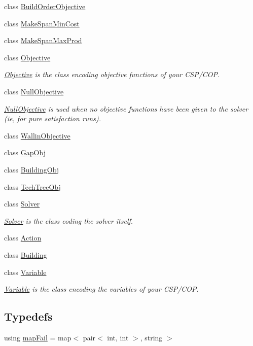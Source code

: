 \begin{DoxyCompactItemize}
class \hyperlink{classghost_1_1BuildOrderObjective}{Build\-Order\-Objective}
\item 
class \hyperlink{classghost_1_1MakeSpanMinCost}{Make\-Span\-Min\-Cost}
\item 
class \hyperlink{classghost_1_1MakeSpanMaxProd}{Make\-Span\-Max\-Prod}
\item 
class \hyperlink{classghost_1_1Objective}{Objective}
\begin{DoxyCompactList}\small\item\em \hyperlink{classghost_1_1Objective}{Objective} is the class encoding objective functions of your C\-S\-P/\-C\-O\-P. \end{DoxyCompactList}\item 
class \hyperlink{classghost_1_1NullObjective}{Null\-Objective}
\begin{DoxyCompactList}\small\item\em \hyperlink{classghost_1_1NullObjective}{Null\-Objective} is used when no objective functions have been given to the solver (ie, for pure satisfaction runs). \end{DoxyCompactList}\item 
class \hyperlink{classghost_1_1WallinObjective}{Wallin\-Objective}
\item 
class \hyperlink{classghost_1_1GapObj}{Gap\-Obj}
\item 
class \hyperlink{classghost_1_1BuildingObj}{Building\-Obj}
\item 
class \hyperlink{classghost_1_1TechTreeObj}{Tech\-Tree\-Obj}
\item 
class \hyperlink{classghost_1_1Solver}{Solver}
\begin{DoxyCompactList}\small\item\em \hyperlink{classghost_1_1Solver}{Solver} is the class coding the solver itself. \end{DoxyCompactList}\item 
class \hyperlink{classghost_1_1Action}{Action}
\item 
class \hyperlink{classghost_1_1Building}{Building}
\item 
class \hyperlink{classghost_1_1Variable}{Variable}
\begin{DoxyCompactList}\small\item\em \hyperlink{classghost_1_1Variable}{Variable} is the class encoding the variables of your C\-S\-P/\-C\-O\-P. \end{DoxyCompactList}\end{DoxyCompactItemize}
\subsection*{Typedefs}
\begin{DoxyCompactItemize}
\item 
using \hyperlink{namespaceghost_af44c393431f46e255b1c303cd50854b8}{map\-Fail} = map$<$ pair$<$ int, int $>$, string $>$
\end{DoxyCompactItemize}
